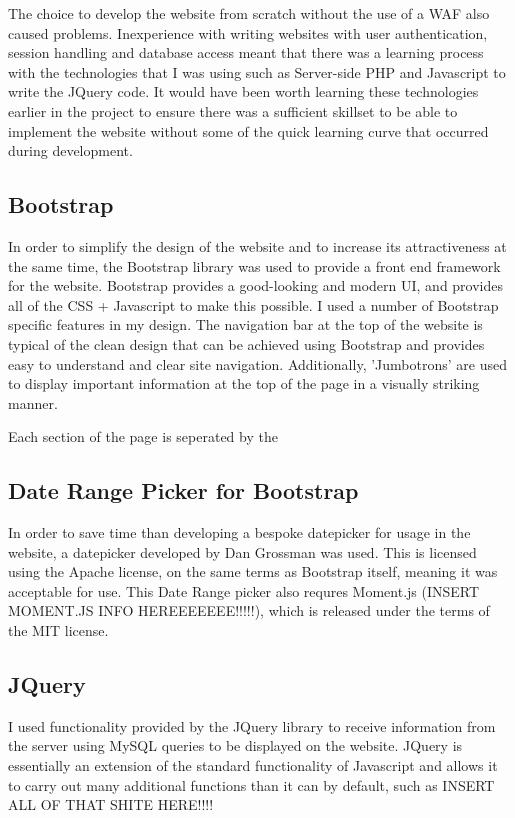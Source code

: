 \documentclass{l4proj}
\begin{document}
The choice to develop the website from scratch without the use of a WAF also caused problems. Inexperience with writing websites with user authentication, session handling and database access meant that there was a learning process with the technologies that I was using such as Server-side PHP and Javascript to write the JQuery code. It would have been worth learning these technologies earlier in the project to ensure there was a sufficient skillset to be able to implement the website without some of the quick learning curve that occurred during development.

\subsection{Bootstrap}

In order to simplify the design of the website and to increase its attractiveness at the same time, the Bootstrap library was used to provide a front end framework for the website. Bootstrap provides a good-looking and modern UI, and provides all of the CSS + Javascript to make this possible. I used a number of Bootstrap specific features in my design. The navigation bar at the top of the website is typical of the clean design that can be achieved using Bootstrap and provides easy to understand and clear site navigation. Additionally, 'Jumbotrons' are used to display important information at the top of the page in a visually striking manner.

Each section of the page is seperated by the 

\subsection{Date Range Picker for Bootstrap}

In order to save time than developing a bespoke datepicker for usage in the website, a datepicker developed by Dan Grossman was used. This is licensed using the Apache license, on the same terms as Bootstrap itself, meaning it was acceptable for use. This Date Range picker also requres Moment.js (INSERT MOMENT.JS INFO HEREEEEEEE!!!!!), which is released under the terms of the MIT license.

\subsection{JQuery}

I used functionality provided by the JQuery library to receive information from the server using MySQL queries to be displayed on the website. JQuery is essentially an extension of the standard functionality of Javascript and allows it to carry out many additional functions than it can by default, such as INSERT ALL OF THAT SHITE HERE!!!!
\end{document}

